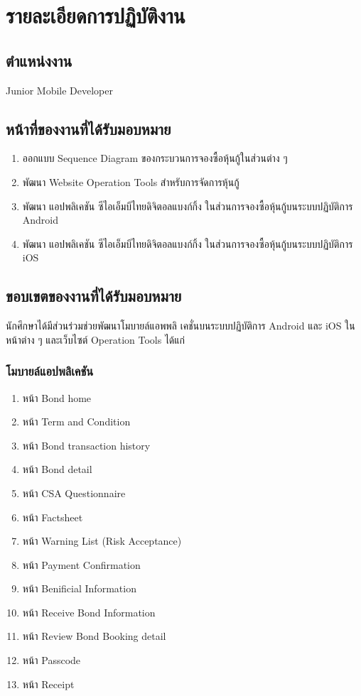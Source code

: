 \chapter{รายละเอียดการปฏิบัติงาน}
\thispagestyle{empty}
\label{chapter:coop-detail}

\section{ตำแหน่งงาน}
    Junior Mobile Developer

\section{หน้าที่ของงานที่ได้รับมอบหมาย}
    \begin{enumerate}
        \item ออกแบบ Sequence Diagram ของกระบวนการจองซื้อหุ้นกู้ในส่วนต่าง ๆ
        \item พัฒนา Website Operation Tools สำหรับการจัดการหุ้นกู้
        \item พัฒนา แอปพลิเคชัน ซีไอเอ็มบีไทยดิจิตอลแบงก์กิ้ง ในส่วนการจองซื้อหุ้นกู้บนระบบปฏิบัติการ Android
        \item พัฒนา แอปพลิเคชัน ซีไอเอ็มบีไทยดิจิตอลแบงก์กิ้ง ในส่วนการจองซื้อหุ้นกู้บนระบบปฏิบัติการ iOS
    \end{enumerate}

\section{ขอบเขตของงานที่ได้รับมอบหมาย}
    นักศึกษาได้มีส่วนร่วมช่วยพัฒนาโมบายล์แอพพลิ
    เคชั่นบนระบบปฏิบัติการ Android และ iOS ในหน้าต่าง ๆ 
    และเว็บไซต์ Operation Tools ได้แก่
    \subsection{โมบายล์แอปพลิเคชัน}
        \begin{enumerate}
            \item หน้า Bond home
            \item หน้า Term and Condition
            \item หน้า Bond transaction history
            \item หน้า Bond detail
            \item หน้า CSA Questionnaire
            \item หน้า Factsheet
            \item หน้า Warning List (Risk Acceptance)
            \item หน้า Payment Confirmation
            \item หน้า Benificial Information
            \item หน้า Receive Bond Information
            \item หน้า Review Bond Booking detail
            \item หน้า Passcode
            \item หน้า Receipt
        \end{enumerate}

